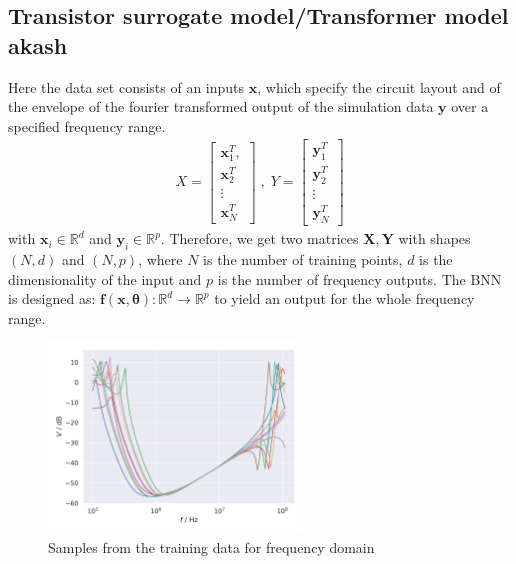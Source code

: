 \documentclass{article}
\begin{document}
\subsection{Transistor surrogate model/Transformer model akash}
Here the data set consists of an inputs $ \bm x$, which specify the circuit layout and of the envelope of the fourier transformed output of the simulation data $\bm y$ over a specified frequency range.
\begin{align}
    X = \begin{bmatrix}
        \bm x_1^T, \\
        \bm x_2^T\\
        \vdots\\
        \bm x_N^T
        \end{bmatrix} \;, \;
    Y = \begin{bmatrix}
        \bm y_1^T\\
        \bm y_2^T\\
        \vdots\\
        \bm y_N^T
    \end{bmatrix}
\end{align}
with $\bm x_i \in \mathbb{R}^d$ and $\bm y_i \in \mathbb{R}^{p}$. Therefore, we get two matrices $\bm X, \bm Y$ with shapes $(N, d)$ and $(N, p)$, where $N$ is the number of training points, $d$ is the dimensionality of the input and $p$ is the number of frequency outputs. The BNN is designed as: $\bm f(\bm x, \bm \theta): \mathbb{R}^d \rightarrow \mathbb{R}^p$ to yield an output for the whole frequency range.
\begin{figure}[h]
    \centering
    \includegraphics[width=0.6\textwidth]{../plots/data_samples.png}
    \caption{Samples from the training data for frequency domain}
    \label{fig:training_samples}
\end{figure}
\end{document}
